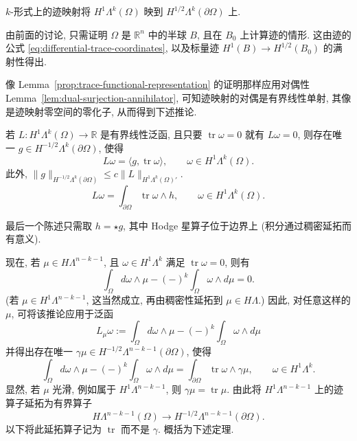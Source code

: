 
\begin{Theorem}\label{thm:forms-h1-trace-surjectivity}
{$k$-形式上的迹映射将 $H^1\Lambda^k(\Omega)$ 映到 $H^{1/2}\Lambda^k(\partial\Omega)$ 上.}
\end{Theorem}

\begin{Proof}
{由前面的讨论, 只需证明 $\Omega$ 是 $\mathbb R^n$ 中的半球 $B$, 且在 $B_0$ 上计算迹的情形. 这由迹的公式 \eqref{eq:differential-trace-coordinates}, 以及标量迹 $H^1(B)\to H^{1/2}(B_0)$ 的满射性得出.}
\end{Proof}

{像 Lemma~\ref{prop:trace-functional-representation} 的证明那样应用对偶性 Lemma~\ref{lem:dual-surjection-annihilator}, 可知迹映射的对偶是有界线性单射, 其像是迹映射零空间的零化子, 从而得到下述推论.}


\begin{Corollary}\label{cor:forms-trace-functional-representation}
{若 $L:H^1\Lambda^k(\Omega)\to\mathbb R$ 是有界线性泛函, 且只要 $\operatorname{tr}\omega=0$ 就有 $L\omega=0$, 则存在唯一 $g\in H^{-1/2}\Lambda^k(\partial\Omega)$, 使得}
\[
L\omega=\langle g,\operatorname{tr}\omega\rangle,\qquad\omega\in H^1\Lambda^k(\Omega).
\]
{此外, $\|g\|_{H^{-1/2}\Lambda^k(\partial\Omega)}\leq c\|L\|_{H^1\Lambda^k(\Omega)'}$.}
\[
L\omega=\int_{\partial\Omega}\operatorname{tr}\omega\wedge h,\qquad\omega\in H^1\Lambda^k(\Omega).
\]
\end{Corollary}

{最后一个陈述只需取 $h=\star g$, 其中 Hodge 星算子位于边界上 (积分通过稠密延拓而有意义).}

{现在, 若 $\mu\in H\Lambda^{n-k-1}$, 且 $\omega\in H^1\Lambda^k$ 满足 $\operatorname{tr}\omega=0$, 则有}
\[
\int_\Omega d\omega\wedge\mu-(-)^k\int_\Omega\omega\wedge d\mu=0.
\]
{(若 $\mu\in H^1\Lambda^{n-k-1}$, 这当然成立, 再由稠密性延拓到 $\mu\in H\Lambda$.) 因此, 对任意这样的 $\mu$, 可将该推论应用于泛函}
\[
L_\mu\omega:=\int_\Omega d\omega\wedge\mu-(-)^k\int_\Omega\omega\wedge d\mu
\]
{并得出存在唯一 $\gamma\mu\in H^{-1/2}\Lambda^{n-k-1}(\partial\Omega)$, 使得}
\[
\int_\Omega d\omega\wedge\mu-(-)^k\int_\Omega\omega\wedge d\mu=\int_{\partial\Omega}\operatorname{tr}\omega\wedge\gamma\mu,\qquad\omega\in H^1\Lambda^k.
\]
{显然, 若 $\mu$ 光滑, 例如属于 $H^1\Lambda^{n-k-1}$, 则 $\gamma\mu=\operatorname{tr}\mu$. 由此将 $H^1\Lambda^{n-k-1}$ 上的迹算子延拓为有界算子}
\[
H\Lambda^{n-k-1}(\Omega)\to H^{-1/2}\Lambda^{n-k-1}(\partial\Omega).
\]
{以下将此延拓算子记为 $\operatorname{tr}$ 而不是 $\gamma$. 概括为下述定理.}

